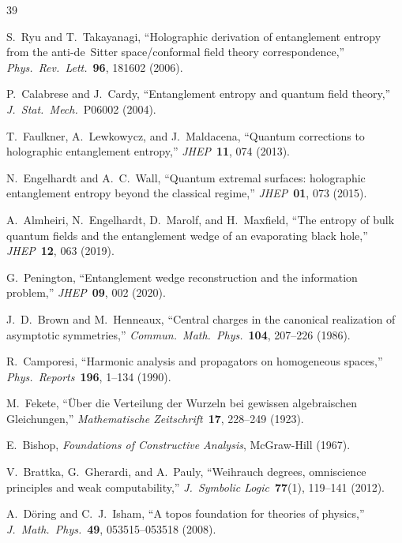 \documentclass[11pt,a4paper]{article}
\theoremstyle{plain}
\theoremstyle{definition}
\begin{document}
\begin{thebibliography}{39}

S.~Ryu and T.~Takayanagi,
``Holographic derivation of entanglement entropy from the anti-de~Sitter space/conformal field theory correspondence,''
\emph{Phys.\ Rev.\ Lett.}\ \textbf{96}, 181602 (2006).

P.~Calabrese and J.~Cardy,
``Entanglement entropy and quantum field theory,''
\emph{J.\ Stat.\ Mech.}\ P06002 (2004).

T.~Faulkner, A.~Lewkowycz, and J.~Maldacena,
``Quantum corrections to holographic entanglement entropy,''
\emph{JHEP}\ \textbf{11}, 074 (2013).

N.~Engelhardt and A.~C.~Wall,
``Quantum extremal surfaces: holographic entanglement entropy beyond the classical regime,''
\emph{JHEP}\ \textbf{01}, 073 (2015).

A.~Almheiri, N.~Engelhardt, D.~Marolf, and H.~Maxfield,
``The entropy of bulk quantum fields and the entanglement wedge of an evaporating black hole,''
\emph{JHEP}\ \textbf{12}, 063 (2019).

G.~Penington,
``Entanglement wedge reconstruction and the information problem,''
\emph{JHEP}\ \textbf{09}, 002 (2020).

J.~D.~Brown and M.~Henneaux,
``Central charges in the canonical realization of asymptotic symmetries,''
\emph{Commun.\ Math.\ Phys.}\ \textbf{104}, 207--226 (1986).

R.~Camporesi,
``Harmonic analysis and propagators on homogeneous spaces,''
\emph{Phys.\ Reports}\ \textbf{196}, 1--134 (1990).

M.~Fekete,
``{\"U}ber die Verteilung der Wurzeln bei gewissen algebraischen Gleichungen,''
\emph{Mathematische Zeitschrift}\ \textbf{17}, 228--249 (1923).

E.~Bishop,
\emph{Foundations of Constructive Analysis},
McGraw-Hill (1967).

V.~Brattka, G.~Gherardi, and A.~Pauly,
``Weihrauch degrees, omniscience principles and weak computability,''
\emph{J.\ Symbolic Logic}\ \textbf{77}(1), 119--141 (2012).

A.~D\"oring and C.~J.~Isham,
``A topos foundation for theories of physics,''
\emph{J.\ Math.\ Phys.}\ \textbf{49}, 053515--053518 (2008).


\end{thebibliography}
\end{document}
